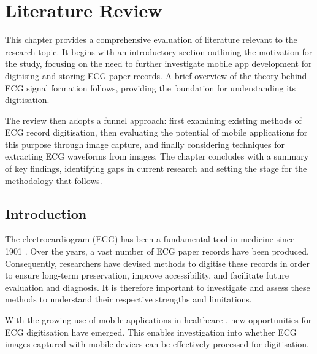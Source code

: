 
\glsresetall %
\chapter[Literature Review]{Literature Review}\label{ch:LitReview}


This chapter provides a comprehensive evaluation of literature relevant to the research topic. It begins with an introductory section outlining the motivation for the study, focusing on the need to further investigate mobile app development for digitising and storing ECG paper records. A brief overview of the theory behind ECG signal formation follows, providing the foundation for understanding its digitisation. 

The review then adopts a funnel approach: first examining existing methods of ECG record digitisation, then evaluating the potential of mobile applications for this purpose through image capture, and finally considering techniques for extracting ECG waveforms from images. The chapter concludes with a summary of key findings, identifying gaps in current research and setting the stage for the methodology that follows.


\section{Introduction}

The electrocardiogram (ECG) has been a fundamental tool in medicine since 1901 \cite{MartinezPerez2013MobileAppsCardiology}. Over the years, a vast number of ECG paper records have been produced. Consequently, researchers have devised methods to digitise these records in order to ensure long-term preservation, improve accessibility, and facilitate future evaluation and diagnosis. It is therefore important to investigate and assess these methods to understand their respective strengths and limitations.

With the growing use of mobile applications in healthcare \cite{Steinhubl2013CanMHealth}, new opportunities for ECG digitisation have emerged. This enables investigation into whether ECG images captured with mobile devices can be effectively processed for digitisation.

